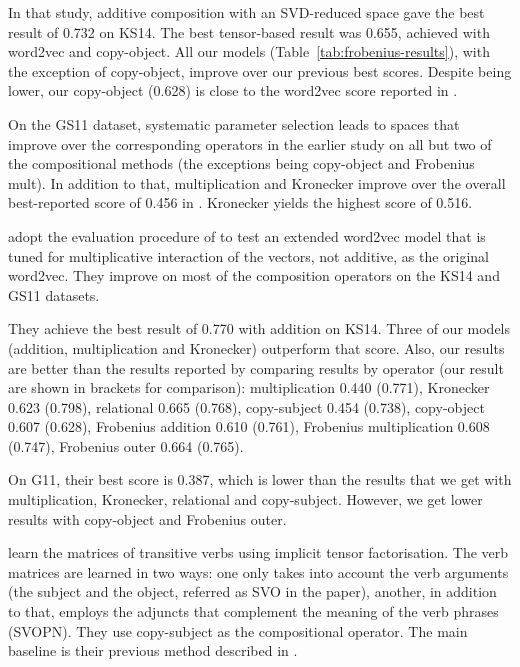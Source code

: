 In that study, additive composition with an SVD-reduced space gave the best result of 0.732 on KS14. The best tensor-based result was 0.655, achieved with word2vec and copy-object. All our models (Table~\ref{tab:frobenius-results}), with the exception of copy-object, improve over our previous best scores. Despite being lower, our copy-object (0.628) is close to the word2vec score reported in .

On the GS11 dataset, systematic parameter selection leads to spaces that improve over the corresponding operators in the earlier study on all but two of the compositional methods (the exceptions being copy-object and Frobenius mult). In addition to that, multiplication and Kronecker improve over the overall best-reported score of 0.456 in . Kronecker yields the highest score of 0.516.

 adopt the evaluation procedure of  to test an extended word2vec model that is tuned for multiplicative interaction of the vectors, not additive, as the original word2vec. They improve on most of the composition operators on the KS14 and GS11 datasets.

They achieve the best result of 0.770 with addition on KS14. Three of our models (addition, multiplication and Kronecker) outperform that score. Also, our results are better than the results reported  by comparing results by operator (our result are shown in brackets for comparison): multiplication 0.440 (0.771), Kronecker 0.623 (0.798), relational 0.665 (0.768), copy-subject 0.454 (0.738), copy-object 0.607 (0.628), Frobenius addition 0.610 (0.761), Frobenius multiplication 0.608 (0.747), Frobenius outer 0.664 (0.765).

On G11, their best score is 0.387, which is lower than the results that we get with multiplication, Kronecker, relational and copy-subject. However, we get lower results with copy-object and Frobenius outer.

 learn the matrices of transitive verbs using implicit tensor factorisation. The verb matrices are learned in two ways: one only takes into account the verb arguments (the subject and the object, referred as SVO in the paper), another, in addition to that, employs the adjuncts that complement the meaning of the verb phrases (SVOPN). They use copy-subject as the compositional operator. The main baseline is their previous method described in .

